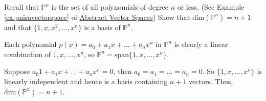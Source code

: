 \documentclass{ximera}
\begin{document}
\begin{example}\label{ex:dimofP}
Recall that $\mathbb{P}^n$ is the set of all polynomials of degree $n$ or less.  (See Example \ref{ex:pnisavectorspace} of \href{https://ximera.osu.edu/oerlinalg/LinearAlgebra/VSP-0050/main}{Abstract Vector Spaces}) Show that $\mbox{dim}( \mathbb{P}^{n}) = n + 1$ and that $\{1, x, x^{2}, \dots, x^{n}\}$ is a basis of $\mathbb{P}^{n}$.

\begin{explanation}
Each polynomial $p(x) = a_{0} + a_{1}x + \ldots + a_{n}x^{n}$ in $\mathbb{P}^{n}$ is clearly a linear combination of $1, x, \dots, x^{n}$, so $\mathbb{P}^{n} = \mbox{span}\{1, x, \dots, x^{n}\}$. 

Suppose $a_{0}1 + a_{1}x + \dots + a_{n}x^{n} = 0$, then $a_{0} = a_{1} = \ldots = a_{n} = 0$. So $\{1, x, \dots, x^{n}\}$ is linearly independent and hence is a basis containing $n + 1$ vectors. Thus, $\mbox{dim}(\mathbb{P}^{n}) = n + 1$.
\end{explanation}
\end{example}
\end{document}

